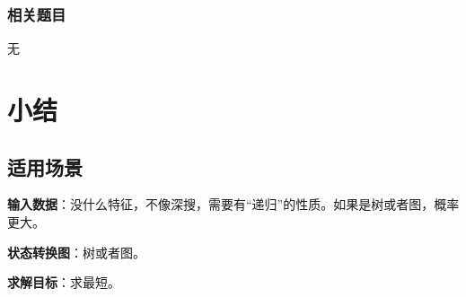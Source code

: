 \subsubsection{相关题目}

\begindot
\item 无
\myenddot


\section{小结} %
\label{sec:bfs-template}


\subsection{适用场景}

\textbf{输入数据}：没什么特征，不像深搜，需要有“递归”的性质。如果是树或者图，概率更大。

\textbf{状态转换图}：树或者图。

\textbf{求解目标}：求最短。



